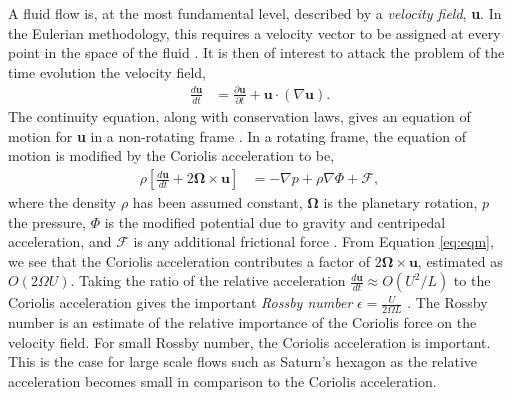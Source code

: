 \documentclass[preprint]{revtex4-1} %
\begin{document}
A fluid flow is, at the most fundamental level, described by a
\textit{velocity field}, \textbf{u}.  In the Eulerian methodology, this requires a velocity
vector to be assigned at every point in the space of the fluid
\cite{Batchelor67}.  It is then of interest to attack the problem of
the time evolution the velocity field,
\begin{align} 
  \frac{d\textbf{u}}{dt} &=
  \frac{\partial\textbf{u}}{\partial t}+\textbf{u}\cdot(\nabla\textbf{u}).
\end{align}
The continuity equation, along with conservation laws, gives an
equation of motion for \textbf{u} in a non-rotating frame
\cite{Pedlosky87}. In a rotating frame, the equation of motion is
modified by the Coriolis acceleration to be,
\begin{align}
  \label{eq:eqm} 
  \rho \left[\frac{d\textbf{u}}{dt} + 2 \boldsymbol{\Omega}\times
    \textbf{u}\right]&= -\nabla p+ \rho\nabla\Phi+\mathcal{F},
\end{align}
where the density $\rho$ has been assumed constant, $\boldsymbol{\Omega}$
is the planetary rotation, $p$ the pressure, $\Phi$ is the
modified potential due to gravity and centripedal
acceleration, and $\mathcal{F}$ is any additional frictional force
\cite{Pedlosky87}.  From Equation \ref{eq:eqm}, we see that the
Coriolis acceleration contributes a factor of $2\boldsymbol{\Omega}\times
\textbf{u}$, estimated as $O(2\Omega U)$.  Taking the ratio of the
relative acceleration $\frac{d\textbf{u}}{dt} \approx O(U^2/L)$ to the
Coriolis acceleration gives the
important \textit{Rossby number} $\epsilon=\frac{U}{2\Omega L}$
\cite{Batchelor67, Pedlosky87}.  The Rossby number is an estimate of
the relative importance of the Coriolis force on the velocity field.
For small Rossby number, the Coriolis acceleration is important.  This
is the case for large scale flows such as Saturn's hexagon as the
relative acceleration becomes small in comparison to the Coriolis acceleration.
\end{document}
